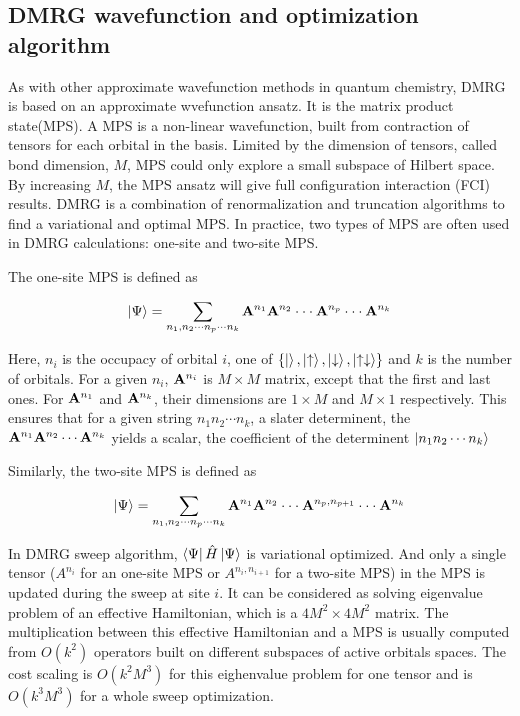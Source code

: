 
\subsection{DMRG wavefunction and optimization algorithm}

As with other approximate wavefunction methods in quantum chemistry, DMRG is based on an approximate wvefunction ansatz. It is the matrix product state(MPS).
A MPS is a non-linear wavefunction, built from contraction of tensors for each orbital in the basis. Limited by the dimension of tensors, called bond dimension, $M$, MPS could only explore a small subspace of Hilbert space. By increasing $M$, the MPS ansatz will give full configuration interaction (FCI) results. DMRG is a combination of renormalization and truncation algorithms to find a variational and optimal MPS. 
In practice, two types of MPS are often used in DMRG calculations: one-site and two-site MPS. 

The one-site MPS is defined as

\begin{equation}
  \ket{\Psi}= \sum_{\substack{n_1, n_2\cdot\cdot\cdot n_p\cdot\cdot\cdot n_k}} {\bf A}^{n_1}{\bf A}^{n_2}\cdot\cdot\cdot {\bf A}^{n_{p}} \cdot\cdot\cdot{\bf A}^{n_k}
\end{equation}

Here, $n_i$ is the occupacy of orbital $i$, one of $ \{\ket{}, \ket{\uparrow}, \ket{\downarrow}, \ket{\uparrow\downarrow}\}$ and $k$ is the number of orbitals. 
For a given $n_i$, ${\bf A}^{n_i}$ is $M\times M$ matrix, except that the first and last ones. For ${\bf A}^{n_1}$ and ${\bf A}^{n_k}$, their dimensions are $1\times M$ and $M\times 1$ respectively. 
This ensures that for a given string $n_1n_2\cdots n_k$, a slater determinent, the ${\bf A}^{n_1}{\bf A}^{n_2}\cdots{\bf A}^{n_k}$ yields a scalar, the coefficient of the determinent $\ket{n_1n_2\cdots n_k}$

Similarly, the two-site MPS is defined as

\begin{equation}
  \ket{\Psi}= \sum_{\substack{n_1, n_2\cdot\cdot\cdot n_p\cdot\cdot\cdot n_k}} {\bf A}^{n_1}{\bf A}^{n_2}\cdot\cdot\cdot {\bf A}^{n_{p},n_{p+1}} \cdot\cdot\cdot{\bf A}^{n_k}
\end{equation}

In DMRG sweep algorithm, $\bra{\Psi}\hat{H}\ket{\Psi}$ is variational optimized. And only a single tensor ($A^{n_i}$ for an one-site MPS or $A^{n_i, n_{i+1}}$ for a two-site MPS) in the MPS is updated during the sweep at site $i$. It can be considered as solving eigenvalue problem of an effective Hamiltonian, which is a $4M^2\times 4M^2$ matrix. 
The multiplication between this effective Hamiltonian and a MPS is usually computed from $O(k^2)$ operators built on different subspaces of active orbitals spaces. The cost scaling is $O(k^2M^3)$ for this eighenvalue problem for one tensor and is $O(k^3M^3)$ for a whole sweep optimization. 

